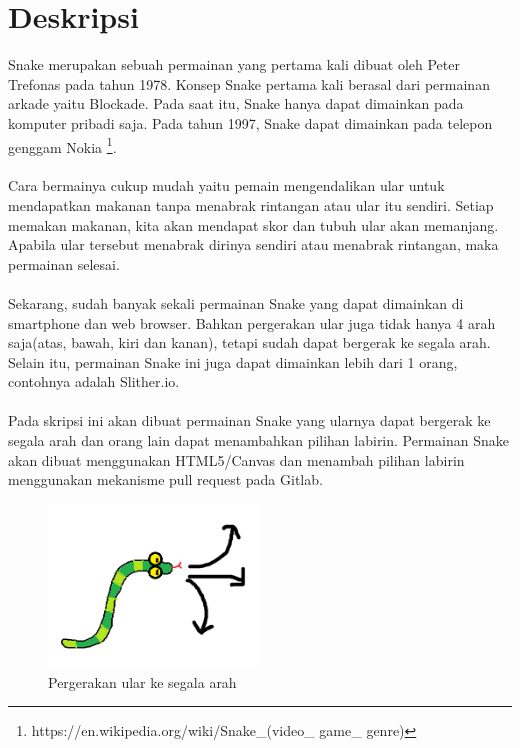 \documentclass[a4paper,twoside]{article}
\begin{document}
\title{\@judultopik}
\author{\nama \textendash \@npm} 

\newcommand{\nama}{Evelyn Wijaya}
\newcommand{\@npm}{2015730030}
\newcommand{\@judultopik}{Open Source Snake 360} %
\newcommand{\jumpemb}{1} %
\newcommand{\tanggal}{05/09/2018}


\maketitle


\section{Deskripsi}
Snake merupakan sebuah permainan yang pertama kali dibuat oleh Peter Trefonas pada tahun 1978. Konsep Snake pertama kali berasal dari permainan arkade yaitu Blockade. Pada saat itu, Snake hanya dapat dimainkan pada komputer pribadi saja. Pada tahun 1997, Snake dapat dimainkan pada telepon genggam Nokia \footnote{https://en.wikipedia.org/wiki/Snake\_(video\_ game\_ genre)}.\\\\
Cara bermainya cukup mudah yaitu pemain mengendalikan ular untuk mendapatkan makanan tanpa menabrak rintangan atau ular itu sendiri. Setiap memakan makanan, kita akan mendapat skor dan tubuh ular akan memanjang. Apabila ular tersebut menabrak dirinya sendiri atau menabrak rintangan, maka permainan selesai.\\\\
Sekarang, sudah banyak sekali permainan Snake yang dapat dimainkan di smartphone dan web browser. Bahkan pergerakan ular juga tidak hanya 4 arah saja(atas, bawah, kiri dan kanan), tetapi sudah dapat bergerak ke segala arah. Selain itu, permainan Snake ini juga dapat dimainkan lebih dari 1 orang, contohnya adalah Slither.io. \\\\
Pada skripsi ini akan dibuat permainan Snake yang ularnya dapat bergerak ke segala arah dan orang lain dapat menambahkan pilihan labirin. Permainan Snake akan dibuat menggunakan HTML5/Canvas dan menambah pilihan labirin menggunakan mekanisme pull request pada Gitlab.

\begin{figure}[H]
\caption{Pergerakan ular ke segala arah}
\centering
\includegraphics[width=0.5\textwidth]{snake.png}
\end{figure}
\end{document}
